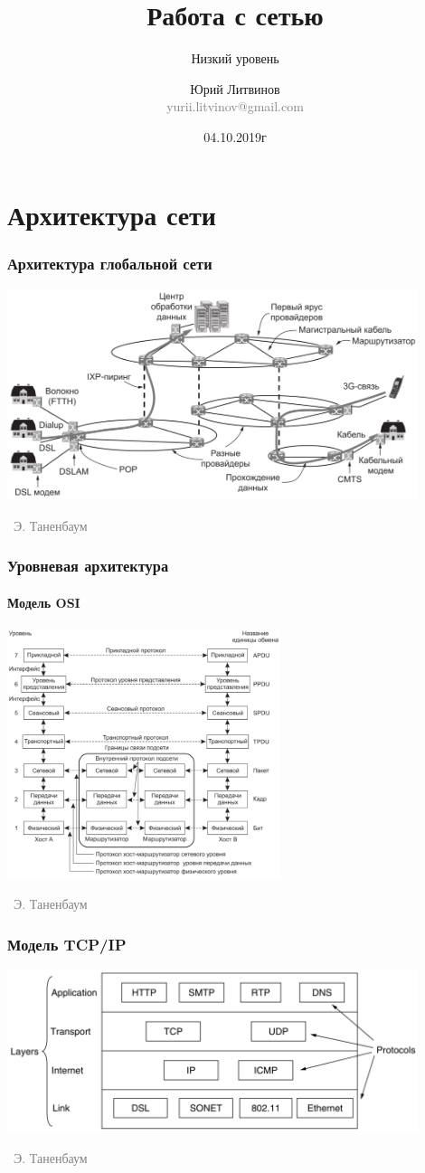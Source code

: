 \documentclass[xetex,mathserif,serif]{beamer}
\title{Работа с сетью}
\subtitle{Низкий уровень}
\author[Юрий Литвинов]{Юрий Литвинов\\\small{\textcolor{gray}{yurii.litvinov@gmail.com}}}
\date{04.10.2019г}
\newcommand{\attribution}[1] {
\vspace{-5mm}\begin{flushright}\begin{scriptsize}\textcolor{gray}{\textcopyright\, #1}\end{scriptsize}\end{flushright}
}
\begin{document}
	\frame{\titlepage}

	\section{Архитектура сети}

	\begin{frame}
		\frametitle{Архитектура глобальной сети}
		\begin{center}
			\includegraphics[width=0.9\textwidth]{internetArchitecture.png}
			\attribution{Э. Таненбаум}
		\end{center}
	\end{frame}

	\begin{frame}
		\frametitle{Уровневая архитектура}
		\framesubtitle{Модель OSI}
		\begin{center}
			\includegraphics[width=0.6\textwidth]{osiStack.png}
			\attribution{Э. Таненбаум}
		\end{center}
	\end{frame}

	\begin{frame}
		\frametitle{Модель TCP/IP}
		\begin{center}
			\includegraphics[width=0.9\textwidth]{tcpIpStack.png}
			\attribution{Э. Таненбаум}
		\end{center}
	\end{frame}
\end{document}
